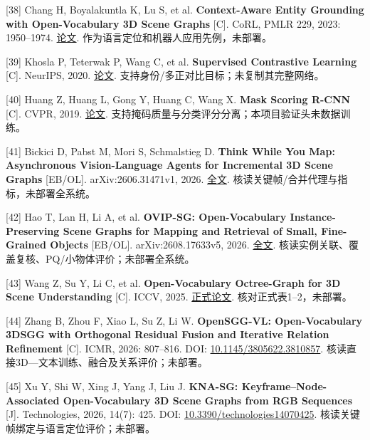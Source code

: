 \documentclass[UTF8,fontset=fandol]{ctexart}
\begin{document}
[38] Chang H, Boyalakuntla K, Lu S, et al. \textbf{Context-Aware Entity Grounding with Open-Vocabulary 3D Scene Graphs} [C]. CoRL, PMLR 229, 2023: 1950–1974. \href{https://proceedings.mlr.press/v229/chang23b.html}{论文}. 作为语言定位和机器人应用先例，未部署。



[39] Khosla P, Teterwak P, Wang C, et al. \textbf{Supervised Contrastive Learning} [C]. NeurIPS, 2020. \href{https://arxiv.org/abs/2004.11362}{论文}. 支持身份/多正对比目标；未复制其完整网络。



[40] Huang Z, Huang L, Gong Y, Huang C, Wang X. \textbf{Mask Scoring R-CNN} [C]. CVPR, 2019. \href{https://arxiv.org/abs/1903.00241}{论文}. 支持掩码质量与分类评分分离；本项目验证头未数据训练。



[41] Bickici D, Pabst M, Mori S, Schmalstieg D. \textbf{Think While You Map: Asynchronous Vision-Language Agents for Incremental 3D Scene Graphs} [EB/OL]. arXiv:2606.31471v1, 2026. \href{https://arxiv.org/html/2606.31471v1}{全文}. 核读关键帧/合并代理与指标，未部署全系统。



[42] Hao T, Lan H, Li A, et al. \textbf{OVIP-SG: Open-Vocabulary Instance-Preserving Scene Graphs for Mapping and Retrieval of Small, Fine-Grained Objects} [EB/OL]. arXiv:2608.17633v5, 2026. \href{https://arxiv.org/html/2608.17633v5}{全文}. 核读实例关联、覆盖复核、PQ/小物体评价；未部署全系统。



[43] Wang Z, Su Y, Li C, et al. \textbf{Open-Vocabulary Octree-Graph for 3D Scene Understanding} [C]. ICCV, 2025. \href{https://openaccess.thecvf.com/content/ICCV2025/papers/Wang\_Open-Vocabulary\_Octree-Graph\_for\_3D\_Scene\_Understanding\_ICCV\_2025\_paper.pdf}{正式论文}. 核对正式表1–2，未部署。



[44] Zhang B, Zhou F, Xiao L, Su Z, Li W. \textbf{OpenSGG-VL: Open-Vocabulary 3DSGG with Orthogonal Residual Fusion and Iterative Relation Refinement} [C]. ICMR, 2026: 807–816. DOI: \href{https://doi.org/10.1145/3805622.3810857}{10.1145/3805622.3810857}. 核读直接3D—文本训练、融合及关系评价；未部署。



[45] Xu Y, Shi W, Xing J, Yang J, Liu J. \textbf{KNA-SG: Keyframe–Node-Associated Open-Vocabulary 3D Scene Graphs from RGB Sequences} [J]. Technologies, 2026, 14(7): 425. DOI: \href{https://www.mdpi.com/2227-7080/14/7/425}{10.3390/technologies14070425}. 核读关键帧绑定与语言定位评价；未部署。
\end{document}
